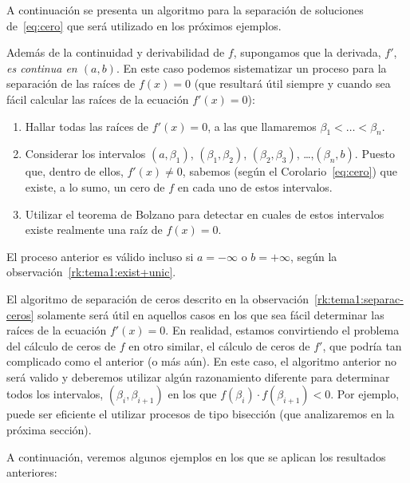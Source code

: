 A continuación se presenta un algoritmo para la separación de
soluciones de~\eqref{eq:cero} que será utilizado en los próximos
ejemplos.

\begin{remark}
  \label{rk:tema1:separac-ceros}
  Además de la continuidad y derivabilidad de $f$, supongamos que la
  derivada, $f'$, \emph{es continua en $(a,b)$}. En este caso podemos
  sistematizar un proceso para la separación de las raíces de $f(x)=0$
  (que resultará útil siempre y cuando sea fácil calcular las raíces
  de la ecuación $f'(x)=0$):
  \begin{enumerate}
  \item Hallar todas las raíces de $f'(x)=0$, a las que llamaremos $\beta_1<\dots<\beta_n$.
  \item Considerar los intervalos $(a,\beta_1)$, $(\beta_1,\beta_2)$,
    $(\beta_2,\beta_3)$, \dots,$(\beta_n,b)$. Puesto que, dentro de
    ellos, $f'(x)\neq 0$, sabemos (según el Corolario~\eqref{eq:cero})
    que existe, a lo sumo, un cero de $f$ en cada uno de estos
    intervalos.
  \item Utilizar el teorema de Bolzano para detectar en cuales de
    estos intervalos existe realmente una raíz de $f(x)=0$.
  \end{enumerate}
  El proceso anterior es válido incluso si $a=-\infty$ o $b=+\infty$,
  según la observación~\ref{rk:tema1:exist+unic}.
\end{remark}

El algoritmo de separación de ceros descrito en la
observación~\ref{rk:tema1:separac-ceros} solamente será útil en
aquellos casos en los que sea fácil determinar las raíces de la
ecuación $f'(x)=0$. En realidad, estamos convirtiendo el problema del
cálculo de ceros de $f$ en otro similar, el cálculo de ceros de $f'$,
que podría tan complicado como el anterior (o más aún). En este caso,
el algoritmo anterior no será valido y deberemos utilizar algún
razonamiento diferente para determinar todos los intervalos,
$(\beta_i,\beta_{i+1})$ en los que $f(\beta_i)\cdot
f(\beta_{i+1})<0$. Por ejemplo, puede ser eficiente el utilizar
procesos de tipo bisección (que analizaremos en la próxima sección).

A continuación, veremos algunos ejemplos en los que se aplican los
resultados anteriores:

